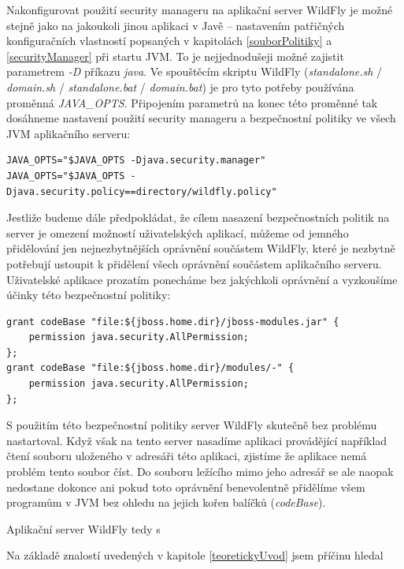 Nakonfigurovat použití security manageru na aplikační server WildFly je možné stejně jako na jakoukoli jinou aplikaci v Javě -- nastavením patřičných konfiguračních vlastností popsaných v kapitolách \ref{souborPolitiky} a \ref{securityManager} při startu JVM. To je nejjednodušeji možné zajistit parametrem {\it -D} příkazu {\it java}. Ve spouštěcím skriptu WildFly ({\it standalone.sh} / {\it domain.sh} / {\it standalone.bat} / {\it domain.bat}) je pro tyto potřeby používána proměnná {\it JAVA\_OPTS}. Připojením parametrů na konec této proměnné tak dosáhneme nastavení použití security manageru a bezpečnostní politiky ve všech JVM aplikačního serveru: \cite{jbossSecurityManager}

\begin{verbatim}
JAVA_OPTS="$JAVA_OPTS -Djava.security.manager"
JAVA_OPTS="$JAVA_OPTS -Djava.security.policy==directory/wildfly.policy"
\end{verbatim}

Jestliže budeme dále předpokládat, že cílem nasazení bezpečnostních politik na server je omezení možností uživatelských aplikací, můžeme od jemného přidělování jen nejnezbytnějších oprávnění součástem WildFly, které je nezbytně potřebují ustoupit k přidělení všech oprávnění součástem aplikačního serveru. Uživatelské aplikace prozatím ponecháme bez jakýchkoli oprávnění a vyzkoušíme účinky této bezpečnostní politiky:

\begin{verbatim}
grant codeBase "file:${jboss.home.dir}/jboss-modules.jar" {
    permission java.security.AllPermission;
};
grant codeBase "file:${jboss.home.dir}/modules/-" {
    permission java.security.AllPermission;
};
\end{verbatim}

S použitím této bezpečnostní politiky server WildFly skutečně bez problému nastartoval. Když však na tento server nasadíme aplikaci provádějící například čtení souboru uloženého v adresáři této aplikaci, zjistíme že aplikace nemá problém tento soubor číst. Do souboru ležícího mimo jeho adresář se ale naopak nedostane dokonce ani pokud toto oprávnění benevolentně přidělíme všem programům v JVM bez ohledu na jejich kořen balíčků ({\it codeBase}).

Aplikační server WildFly tedy s 

Na základě znalostí uvedených v kapitole \ref{teoretickyUvod} jsem příčinu hledal 


\cite{javaEEspec}







